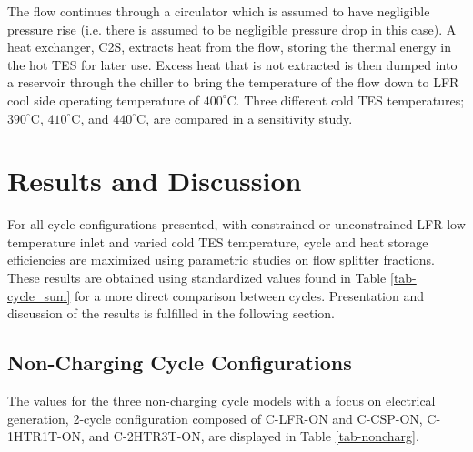 \begin{paracol}{2}
\linenumbers
\switchcolumn

The flow continues through a circulator which is assumed to have negligible pressure rise (i.e. there is assumed to be negligible pressure drop in this case). A heat exchanger, C2S, extracts heat from the flow, storing the thermal energy in the hot TES for later use. Excess heat that is not extracted is then dumped into a reservoir through the chiller to bring the temperature of the flow down to LFR cool side operating temperature of $400^{\circ}$C. Three different cold TES temperatures; $390^{\circ}$C, $410^{\circ}$C, and $440^{\circ}$C, are compared in a sensitivity study. 



\section{Results and Discussion}

For all cycle configurations presented, with constrained or unconstrained LFR low temperature inlet and varied cold TES temperature, cycle and heat storage efficiencies are maximized using parametric studies on flow splitter fractions. These results are obtained using standardized values found in Table \ref{tab-cycle_sum} for a more direct comparison between cycles. Presentation and discussion of the results is fulfilled in the following section. 

\subsection{Non-Charging Cycle Configurations}

The values for the three non-charging cycle models with a focus on electrical generation, 2-cycle configuration composed of C-LFR-ON and C-CSP-ON, C-1HTR1T-ON, and C-2HTR3T-ON, are displayed in Table \ref{tab-noncharg}. 

\end{paracol}
